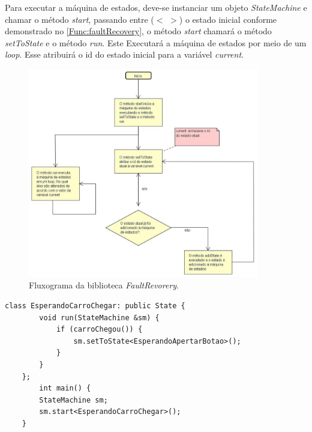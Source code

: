 \begin{itemize}
	 Para executar a máquina de estados, deve-se instanciar um objeto \textit{StateMachine} e chamar o método \textit{start}, passando entre ($<$ $>$) o estado inicial conforme demonstrado no \autoref{Func:faultRecovery}, o método \textit{start} chamará o método \textit{setToState} e o método \textit{run}. Este Executará a máquina de estados por meio de um \textit{loop}. Esse atribuirá o id do estado inicial para a variável \textit{current}.
		
\end{itemize}

\begin{figure}[H]
	\centering
	\includegraphics[width=0.9\textwidth]{figuras/fluxoFaultRecovery.jpg}
	\caption[Fluxograma da biblioteca \textit{FaultRecovery}.]{Fluxograma da biblioteca \textit{FaultRevorery}.}
	\label{Img:fluxoFaultRecovery}	
\end{figure}
\newpage
\begin{lstlisting}[label=Func:faultRecovery,caption={[Exemplo de criação de um estado]A classe EsperandoCarroChegar herda da classe \textit{State} e tem sua rotina implementada no método \textit{run}, ao encerrar a rotina o método \textit{setToState} é invocado, alterando o estado atual. No método \textit{main} um objeto \textit{StateMachine} é instanciado e o método \textit{start} é chamado, iniciando a máquina de estados. Este quadro tem como objetivo demonstrar a utilização da biblioteca, apenas um estado será posto no quadro, os demais serão anexados ao trabalho.}]
	class EsperandoCarroChegar: public State {
		void run(StateMachine &sm) {
			if (carroChegou()) {
				sm.setToState<EsperandoApertarBotao>();
			}
		}
	};
		int main() {
		StateMachine sm;
		sm.start<EsperandoCarroChegar>();
	}
\end{lstlisting}

